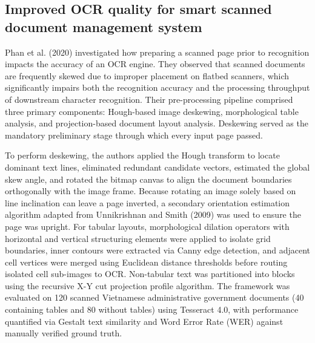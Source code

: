 \subsection{Improved OCR quality for smart scanned document management system}

Phan et al. (2020) investigated how preparing a scanned page prior to recognition impacts the accuracy of an OCR engine.
They observed that scanned documents are frequently skewed due to improper placement on flatbed scanners, which significantly impairs both the recognition accuracy and the processing throughput of downstream character recognition.
Their pre-processing pipeline comprised three primary components: Hough-based image deskewing, morphological table analysis, and projection-based document layout analysis.
Deskewing served as the mandatory preliminary stage through which every input page passed.

To perform deskewing, the authors applied the Hough transform to locate dominant text lines, eliminated redundant candidate vectors, estimated the global skew angle, and rotated the bitmap canvas to align the document boundaries orthogonally with the image frame.
Because rotating an image solely based on line inclination can leave a page inverted, a secondary orientation estimation algorithm adapted from Unnikrishnan and Smith (2009) was used to ensure the page was upright.
For tabular layouts, morphological dilation operators with horizontal and vertical structuring elements were applied to isolate grid boundaries, inner contours were extracted via Canny edge detection, and adjacent cell vertices were merged using Euclidean distance thresholds before routing isolated cell sub-images to OCR.
Non-tabular text was partitioned into blocks using the recursive X-Y cut projection profile algorithm.
The framework was evaluated on 120 scanned Vietnamese administrative government documents (40 containing tables and 80 without tables) using Tesseract 4.0, with performance quantified via Gestalt text similarity and Word Error Rate (WER) against manually verified ground truth.

